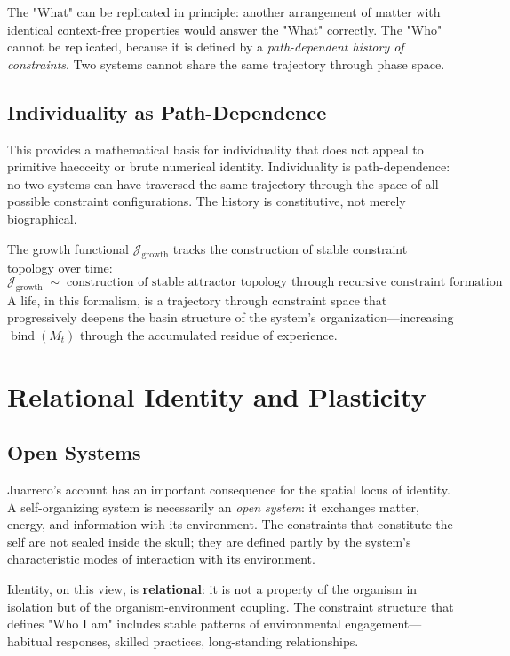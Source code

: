 \documentclass[11pt]{article}
\newcommand{\bind}{\operatorname{bind}}
\newcommand{\Jgrowth}{\mathcal{J}_{\mathrm{growth}}}
\begin{document}
The "What" can be replicated in principle: another arrangement of matter with identical
context-free properties would answer the "What" correctly. The "Who" cannot be replicated,
because it is defined by a \emph{path-dependent history of constraints}. Two systems
cannot share the same trajectory through phase space.

\subsection{Individuality as Path-Dependence}

This provides a mathematical basis for individuality that does not appeal to primitive
haecceity or brute numerical identity. Individuality is path-dependence: no two systems
can have traversed the same trajectory through the space of all possible constraint
configurations. The history is constitutive, not merely biographical.

The growth functional $\Jgrowth$ tracks the construction of stable constraint topology
over time:
\[
\Jgrowth \;\sim\; \text{construction of stable attractor topology through recursive constraint formation}
\]
A life, in this formalism, is a trajectory through constraint space that progressively
deepens the basin structure of the system's organization—increasing $\bind(M_t)$ through
the accumulated residue of experience.

\section{Relational Identity and Plasticity}

\subsection{Open Systems}

Juarrero's account has an important consequence for the spatial locus of identity. A
self-organizing system is necessarily an \emph{open system}: it exchanges matter, energy,
and information with its environment. The constraints that constitute the self are not
sealed inside the skull; they are defined partly by the system's characteristic modes of
interaction with its environment.

Identity, on this view, is \textbf{relational}: it is not a property of the organism in
isolation but of the organism-environment coupling. The constraint structure that defines
"Who I am" includes stable patterns of environmental engagement—habitual responses,
skilled practices, long-standing relationships.
\end{document}
